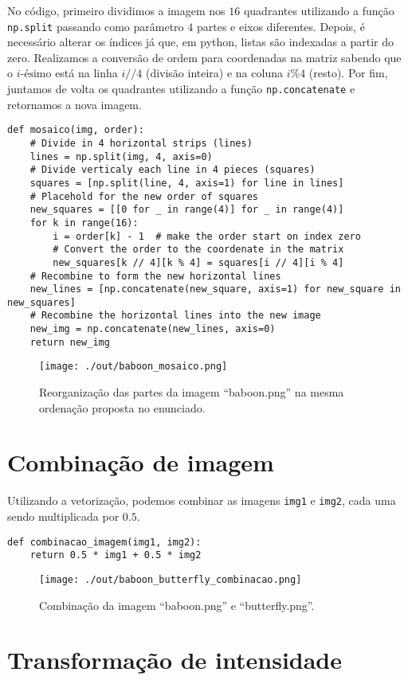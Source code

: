\documentclass[11pt]{article}
\begin{document}
No código, primeiro dividimos a imagem nos \(16\) quadrantes utilizando a função \texttt{np.split} passando como parâmetro \(4\) partes e eixos diferentes.
Depois, é necessário alterar os índices já que, em python, listas são indexadas a partir do zero.
Realizamos a conversão de ordem para coordenadas na matriz sabendo que o \(i\text{-ésimo}\) está na linha \(i // 4\) (divisão inteira) e na coluna \(i \% 4\) (resto).
Por fim, juntamos de volta os quadrantes utilizando a função \texttt{np.concatenate} e retornamos a nova imagem.
\begin{verbatim}
def mosaico(img, order):
    # Divide in 4 horizontal strips (lines)
    lines = np.split(img, 4, axis=0)
    # Divide verticaly each line in 4 pieces (squares)
    squares = [np.split(line, 4, axis=1) for line in lines]
    # Placehold for the new order of squares
    new_squares = [[0 for _ in range(4)] for _ in range(4)]
    for k in range(16):
        i = order[k] - 1  # make the order start on index zero
        # Convert the order to the coordenate in the matrix
        new_squares[k // 4][k % 4] = squares[i // 4][i % 4]
    # Recombine to form the new horizontal lines
    new_lines = [np.concatenate(new_square, axis=1) for new_square in new_squares]
    # Recombine the horizontal lines into the new image
    new_img = np.concatenate(new_lines, axis=0)
    return new_img
\end{verbatim}
\begin{figure}[H]
\centering
\texttt{[image: ./out/baboon\_mosaico.png]}
\caption{Reorganização das partes da imagem ``baboon.png'' na mesma ordenação proposta no enunciado.}
\end{figure}

\newpage
\section*{Combinação de imagem}
\label{sec:org1d7eaf0}
Utilizando a vetorização, podemos combinar as imagens \texttt{img1} e \texttt{img2}, cada uma sendo multiplicada por \(0.5\).
\begin{verbatim}
def combinacao_imagem(img1, img2):
    return 0.5 * img1 + 0.5 * img2
\end{verbatim}
\begin{figure}[H]
\centering
\texttt{[image: ./out/baboon\_butterfly\_combinacao.png]}
\caption{Combinação da imagem ``baboon.png'' e ``butterfly.png''.}
\end{figure}

\newpage
\section*{Transformação de intensidade}
\label{sec:orgd15e679}
\end{document}
